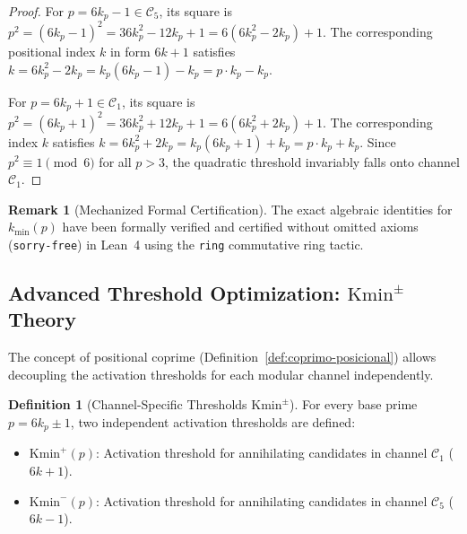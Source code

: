 \documentclass{article}
\numberwithin{equation}{section}
\theoremstyle{plain}
\theoremstyle{definition}
\newtheorem{definition}[theorem]{Definition}
\newtheorem{remark}[theorem]{Remark}
\begin{document}
\begin{proof}
For $p = 6k_p - 1 \in \mathcal{C}_5$, its square is $p^2 = (6k_p - 1)^2 = 36k_p^2 - 12k_p + 1 = 6(6k_p^2 - 2k_p) + 1$.
The corresponding positional index $k$ in form $6k+1$ satisfies $k = 6k_p^2 - 2k_p = k_p(6k_p - 1) - k_p = p \cdot k_p - k_p$.

For $p = 6k_p + 1 \in \mathcal{C}_1$, its square is $p^2 = (6k_p + 1)^2 = 36k_p^2 + 12k_p + 1 = 6(6k_p^2 + 2k_p) + 1$.
The corresponding index $k$ satisfies $k = 6k_p^2 + 2k_p = k_p(6k_p + 1) + k_p = p \cdot k_p + k_p$.
Since $p^2 \equiv 1 \pmod 6$ for all $p > 3$, the quadratic threshold invariably falls onto channel $\mathcal{C}_1$.
\end{proof}

\begin{remark}[Mechanized Formal Certification]
\label{rem:certificacion-kmin}
The exact algebraic identities for $k_{\min}(p)$ have been formally verified and certified without omitted axioms (\texttt{sorry-free}) in Lean~4 using the \texttt{ring} commutative ring tactic.
\end{remark}

\subsection{Advanced Threshold Optimization: $\mathrm{Kmin}^\pm$ Theory}

The concept of positional coprime (Definition~\ref{def:coprimo-posicional}) allows decoupling the activation thresholds for each modular channel independently.

\begin{definition}[Channel-Specific Thresholds $\mathrm{Kmin}^\pm$]
\label{def:kmin-pm}
For every base prime $p = 6k_p \pm 1$, two independent activation thresholds are defined:
\begin{itemize}
    \item $\mathrm{Kmin}^+(p)$: Activation threshold for annihilating candidates in channel $\mathcal{C}_1$ ($6k+1$).
    \item $\mathrm{Kmin}^-(p)$: Activation threshold for annihilating candidates in channel $\mathcal{C}_5$ ($6k-1$).
\end{itemize}
\end{definition}
\end{document}
